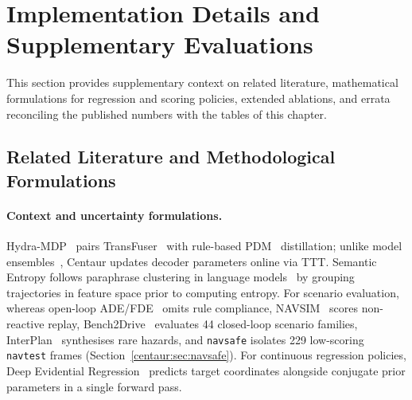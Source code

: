 \section{Implementation Details and Supplementary Evaluations}\label{app:centaur}

This section provides supplementary context on related literature, mathematical formulations for regression and scoring policies, extended ablations, and errata reconciling the published numbers with the tables of this chapter.

\subsection{Related Literature and Methodological Formulations}\label{centaur:app:scoring}\label{centaur:app:related}\label{centaur:app:method}\label{centaur:app:regression}\label{centaur:app:entropy}

\paragraph{Context and uncertainty formulations.} Hydra-MDP~\cite{li2024hydramdp} pairs TransFuser~\cite{chitta2023transfuser} with rule-based PDM~\cite{dauner2023parting} distillation; unlike model ensembles~\cite{lakshminarayanan2017simple,li2024perceptionuncertainties}, Centaur updates decoder parameters online via TTT. Semantic Entropy follows paraphrase clustering in language models~\cite{kuhn2023semantic} by grouping trajectories in feature space prior to computing entropy. For scenario evaluation, whereas open-loop ADE/FDE~\cite{hu2023uniad,jiang2023vad,li2024ego} omits rule compliance, NAVSIM~\cite{dauner2024navsim} scores non-reactive replay, Bench2Drive~\cite{jia2024bench2drive} evaluates 44 closed-loop scenario families, InterPlan~\cite{hallgarten2024interplan} synthesises rare hazards, and \texttt{navsafe} isolates 229 low-scoring \texttt{navtest} frames (Section~\ref{centaur:sec:navsafe}). For continuous regression policies, Deep Evidential Regression~\cite{amini2020deepevidential} predicts target coordinates alongside conjugate prior parameters in a single forward pass.

